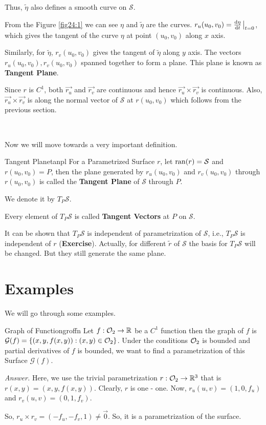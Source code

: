 \documentclass[../Analysis-3.tex]{subfiles}
\begin{document}
Thus, $\tilde{\eta}$ also defines a smooth curve on $\mathcal{S}$.

From the Figure \ref{fig24:1} we can see $\eta$ and $\tilde{\eta}$ are the curves. $r_u(u_0,v_0)=\dv{\eta}{t}\eval_{t=0}$, which gives the tangent of the curve $\eta$ at point $(u_0,v_0)$ along $x$ axis.

Similarly, for $\tilde{\eta}$, $r_v(u_0,v_0)$  gives the tangent of $\tilde{\eta}$ along $y$ axis. The vectors $r_u(u_0,v_0),r_v(u_0,v_0)$ spanned together to form a plane. This plane is known as \textbf{Tangent Plane}.

Since $r$ is $C^1$, both $\vec{r_u}$ and $\vec{r_v}$ are continuous and hence $\vec{r_u} \times \vec{r_v}$ is continuous. Also, $\vec{r_u} \times \vec{r_v}$ is along the normal vector of $\mathcal{S}$ at $r(u_0,v_0)$ which follows from the previous section.

\

Now we will move towards a very important definition.

\begin{Def}{Tangent Plane}{tanpl}
  For a Parametrized Surface $r$, let $\operatorname{ran}(r)=\mathcal{S}$ and $r(u_0,v_0)=P$, then the plane generated by $r_u(u_0,v_0)$ and $r_v(u_0,v_0)$ through $r(u_0,v_0)$ is called the \textbf{Tangent Plane} of $\mathcal{S}$ through $P$.

  We denote it by $T_P\mathcal{S}$.

  Every element of $T_P\mathcal{S}$ is called \textbf{Tangent Vectors} at $P$ on $\mathcal{S}$.
\end{Def}

It can be shown that $T_P\mathcal{S}$ is independent of parametrization of $\mathcal{S}$, i.e., $T_P\mathcal{S}$ is independent of $r$ (\textbf{Exercise}). Actually, for different $\tilde{r}$ of $\mathcal{S}$ the basis for $T_P\mathcal{S}$ will be changed. But they still generate the same plane.

\section{Examples}

We will go through some examples.

\begin{Eg}{Graph of Function}{groffn}
  Let $f : \mathcal{O}_{2} \to \mathbb{R}$ be a $C^1$ function then the graph of $f$ is $\mathcal{G}(f) = \{ (x,y,f(x,y)) : (x,y)\in \mathcal{O}_{2}\}$. Under the conditions $\mathcal{O}_{2}$ is bounded and partial derivatives of $f$ is bounded, we want to find a parametrization of this Surface $\mathcal{G}(f)$.

  \textit{Answer.} Here, we use the trivial parametrization $r : \mathcal{O}_{2} \to \mathbb{R}^3$ that is $ r(x,y) = (x,y,f(x,y))$. Clearly, $r$ is one - one. Now, $r_u(u,v) = (1,0,f_u)$ and $r_v(u,v) = (0,1,f_v)$.

  So, $ r_u \times r_v = (-f_u,-f_v,1) \neq \vec{0}$. So, it is a parametrization of the surface.
\end{Eg}
\end{document}

